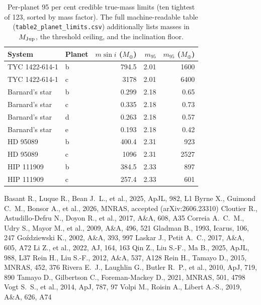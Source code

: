 \documentclass[fleqn,usenatbib]{mnras}
\newcommand{\msini}{m\sin i}
\newcommand{\mjup}{M_{\rm Jup}}
\newcommand{\mearth}{M_\oplus}
\begin{document}
\begin{table}
\centering
\caption{Per-planet 95 per cent credible true-mass limits (ten tightest of
123, sorted by mass factor). The full machine-readable table
(\texttt{table2\_planet\_limits.csv}) additionally lists masses in
$\mjup$, the threshold ceiling, and the inclination floor.}
\label{tab:limits}
\begin{tabular}{llrrr}
\hline
System & Planet & $\msini$ ($\mearth$) & $m_{95}$ & $m_{95}$ ($\mearth$) \\
\hline
TYC 1422-614-1 & b & 794.5 & 2.01 & 1600 \\
TYC 1422-614-1 & c & 3178  & 2.01 & 6400 \\
Barnard's star & b & 0.299 & 2.18 & 0.65 \\
Barnard's star & c & 0.335 & 2.18 & 0.73 \\
Barnard's star & d & 0.263 & 2.18 & 0.57 \\
Barnard's star & e & 0.193 & 2.18 & 0.42 \\
HD 95089       & b & 400.4 & 2.31 & 923  \\
HD 95089       & c & 1096  & 2.31 & 2527 \\
HIP 111909     & b & 384.5 & 2.33 & 897  \\
HIP 111909     & c & 257.4 & 2.33 & 601  \\
\hline
\end{tabular}
\end{table}


\begin{thebibliography}{}
 Basant R., Luque R., Bean
J.~L., et al., 2025, ApJL, 982, L1
 Byrne X., Guimond C.~M., Bonsor
A., et al., 2026, MNRAS, accepted (arXiv:2606.23310)
 Cloutier R.,
Astudillo-Defru N., Doyon R., et al., 2017, A\&A, 608, A35
 Correia A.~C.~M., Udry S.,
Mayor M., et al., 2009, A\&A, 496, 521
 Gladman B., 1993, Icarus, 106, 247
 Go\'zdziewski K., 2002,
A\&A, 393, 997
 Laskar J., Petit A.~C.,
2017, A\&A, 605, A72
 Li Z., et al., 2022, AJ, 164, 163
 Qin Z., Liu S.-F., Ma B., 2025, ApJL,
988, L37
 Rein H., Liu S.-F., 2012, A\&A,
537, A128
 Rein H., Tamayo D., 2015,
MNRAS, 452, 376
 Rivera E.~J., Laughlin G.,
Butler R.~P., et al., 2010, ApJ, 719, 890
 Tamayo D., Gilbertson C.,
Foreman-Mackey D., 2021, MNRAS, 501, 4798
 Vogt S.~S., et al., 2014, ApJ, 787,
97
 Volpi M., Roisin A., Libert
A.-S., 2019, A\&A, 626, A74
\end{thebibliography}

\bsp
\label{lastpage}
\end{document}
